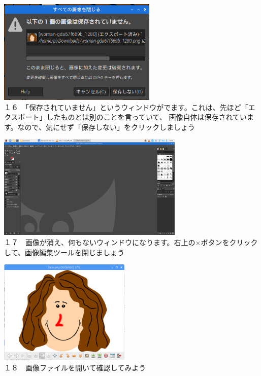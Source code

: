 \documentclass[a4paper,12pt]{jarticle}
\begin{document}
\begin{minipage}{0.45\linewidth}
  \includegraphics[width=\linewidth,height=5cm]{textbook-img1031.png}\\
  １６　「保存されていません」というウィンドウがでます。これは、先ほど「エクスポート」したものとは別のことを言っていて、
  画像自体は保存されています。なので、気にせず「保存しない」をクリックしましょう
\end{minipage}
\hfill
\vspace{20pt}
\begin{minipage}{0.45\linewidth}
  \includegraphics[width=\linewidth,height=5cm]{textbook-img1032.png}\\
  １７　画像が消え、何もないウィンドウになります。右上の×ボタンをクリックして、画像編集ツールを閉じましょう
\end{minipage}
\begin{minipage}{0.45\linewidth}
  \includegraphics[width=\linewidth,height=5cm]{textbook-img139.png}\\
  １８　画像ファイルを開いて確認してみよう
\end{minipage}
\hfill
\vspace{20pt}
\end{document}
